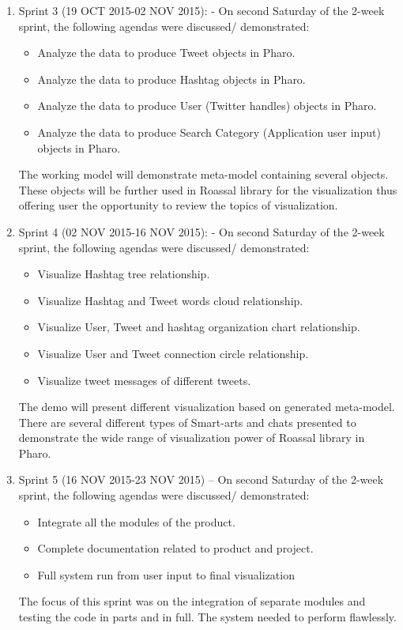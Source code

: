 \documentclass[11pt]{article}
\begin{document}
\begin{enumerate}
\item Sprint 3 (19 OCT 2015-02 NOV 2015): - On second Saturday of the 2-week sprint, the following agendas were discussed/ demonstrated:
\begin{itemize}
\item Analyze the data to produce Tweet objects in Pharo.
\item Analyze the data to produce Hashtag objects in Pharo.
\item Analyze the data to produce User (Twitter handles) objects in Pharo.
\item Analyze the data to produce Search Category (Application user input) objects in Pharo.
\end{itemize}
The working model will demonstrate meta-model containing several objects. These objects will be further used in Roassal library for the visualization thus offering user the opportunity to review the topics of visualization.
\item Sprint 4 (02 NOV 2015-16 NOV 2015): - On second Saturday of the 2-week sprint, the following agendas were discussed/ demonstrated:
\begin{itemize}
\item Visualize Hashtag tree relationship.
\item Visualize Hashtag and Tweet words cloud relationship.
\item Visualize User, Tweet and hashtag organization chart relationship.
\item Visualize User and Tweet connection circle relationship.
\item Visualize tweet messages of different tweets.
\end{itemize}
The demo will present different visualization based on generated meta-model. There are several different types of Smart-arts and chats presented to demonstrate the wide range of visualization power of Roassal library in Pharo.
\item Sprint 5 (16 NOV 2015-23 NOV 2015) – On second Saturday of the 2-week sprint, the following agendas were discussed/ demonstrated:
\begin{itemize}
\item Integrate all the modules of the product.
\item Complete documentation related to product and project.
\item Full system run from user input to final visualization
\end{itemize}
The focus of this sprint was on the integration of separate modules and testing the code in parts and in full. The system needed to perform flawlessly.

\end{enumerate}
\end{document}
